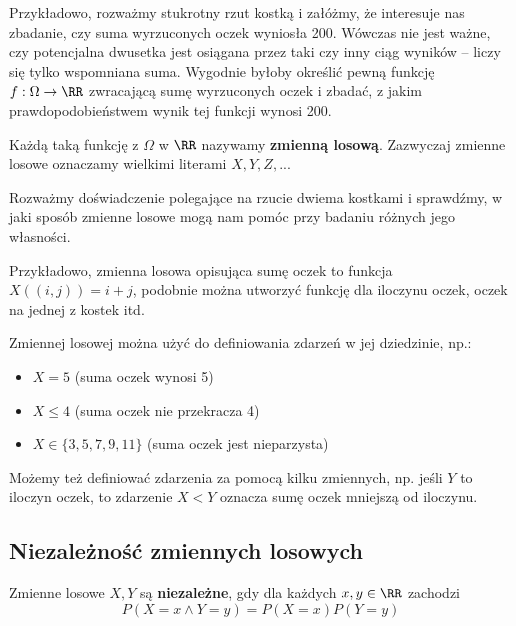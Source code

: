 Przykładowo, rozważmy stukrotny rzut kostką i załóżmy, że interesuje nas zbadanie, czy suma wyrzuconych oczek wyniosła 200. Wówczas nie jest ważne, czy potencjalna dwusetka jest osiągana przez taki czy inny ciąg wyników -- liczy się tylko wspomniana suma. Wygodnie byłoby określić pewną funkcję $f : \Omega \to \RR$ zwracającą sumę wyrzuconych oczek i zbadać, z jakim prawdopodobieństwem wynik tej funkcji wynosi 200.

Każdą taką funkcję z $\Omega$ w $\RR$ nazywamy \textbf{zmienną losową}. Zazwyczaj zmienne losowe oznaczamy wielkimi literami $X, Y, Z, ...$

\begin{example}
    Rozważmy doświadczenie polegające na rzucie dwiema kostkami i sprawdźmy, w jaki sposób zmienne losowe mogą nam pomóc przy badaniu różnych jego własności.
    
    Przykładowo, zmienna losowa opisująca sumę oczek to funkcja $X((i,j)) = i + j$, podobnie można utworzyć funkcję dla iloczynu oczek, oczek na jednej z kostek itd.
    
    Zmiennej losowej można użyć do definiowania zdarzeń w jej dziedzinie, np.:
    \begin{itemize}
        \item $X = 5$ (suma oczek wynosi 5)
        \item $X \leq 4$ (suma oczek nie przekracza 4)
        \item $X \in \{3, 5, 7, 9, 11\}$ (suma oczek jest nieparzysta)
    \end{itemize}

    Możemy też definiować zdarzenia za pomocą kilku zmiennych, np. jeśli $Y$ to iloczyn oczek, to zdarzenie $X < Y$ oznacza sumę oczek mniejszą od iloczynu.
\end{example}

\subsection{Niezależność zmiennych losowych}

Zmienne losowe $X, Y$ są \textbf{niezależne}, gdy dla każdych $x,y\in\RR$ zachodzi
$$P(X=x \wedge Y=y) = P(X=x)P(Y=y)$$

